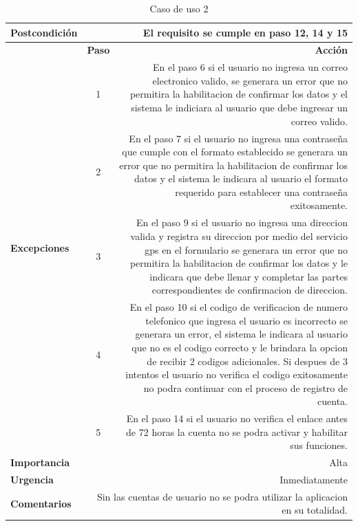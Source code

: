 \documentclass[conference]{IEEEtran}
\begin{document}
\begin{table}[H]
\begin{adjustbox}{width=0.45\textwidth}
\begin{tabular}{|p{11.215em}|r|r|}
    \midrule
    \textbf{Postcondición} & \multicolumn{2}{p{37.43em}|}{El requisito se cumple en paso 12, 14 y 15 } \\
    \midrule
    \multirow{6}[12]{*}{\textbf{Excepciones}} & \textbf{Paso} & \multicolumn{1}{p{32em}|}{\textbf{Acción}} \\
\cmidrule{2-3}    \multicolumn{1}{|c|}{} & \multicolumn{1}{c|}{1} & \multicolumn{1}{p{32em}|}{En el paso 6 si el usuario no ingresa un correo electronico valido, se generara un error que no permitira la habilitacion de confirmar los datos y el sistema le indiciara al usuario que debe ingresar un correo valido.} \\
\cmidrule{2-3}    \multicolumn{1}{|c|}{} & \multicolumn{1}{c|}{2} & \multicolumn{1}{p{32em}|}{En el paso 7 si el usuario no ingresa una contraseña que cumple con el formato establecido se generara un error que no permitira la habilitacion de confirmar los datos y el sistema le indicara al usuario el formato requerido para establecer una contraseña exitosamente.} \\
\cmidrule{2-3}    \multicolumn{1}{|c|}{} & \multicolumn{1}{c|}{3} & \multicolumn{1}{p{32em}|}{En el paso 9 si el usuario no ingresa una direccion valida y registra su direccion por medio del servicio gps en el formulario se generara un error que no permitira la habilitacion de confirmar los datos y le indicara que debe llenar y completar las partes correspondientes de confirmacion de direccion.} \\
\cmidrule{2-3}    \multicolumn{1}{|c|}{} & \multicolumn{1}{c|}{4} & \multicolumn{1}{p{32em}|}{En el paso 10 si el codigo de verificacion de numero telefonico que ingresa el usuario es incorrecto se generara un error, el sistema le indicara al usuario que no es el codigo correcto y le brindara la opcion de recibir 2 codigos adicionales. Si despues de 3 intentos el usuario no verifica el codigo exitosamente no podra continuar con el proceso de registro de cuenta.} \\
\cmidrule{2-3}    \multicolumn{1}{|c|}{} & \multicolumn{1}{c|}{5} & \multicolumn{1}{p{32em}|}{En el paso 14 si el usuario no verifica el enlace antes de 72 horas la cuenta no se podra activar y habilitar sus funciones.} \\
    \midrule
    \textbf{Importancia} & \multicolumn{2}{p{37.43em}|}{Alta} \\
    \midrule
    \textbf{Urgencia} & \multicolumn{2}{p{37.43em}|}{Inmediatamente} \\
    \midrule
    \textbf{Comentarios} & \multicolumn{2}{p{37.43em}|}{Sin las cuentas de usuario no se podra utilizar la aplicacion en su totalidad.} \\
    \bottomrule
    \end{tabular}%
    \end{adjustbox}
    \vspace{0.2cm}
    \caption{Caso de uso 2}
  \label{tab:addlabel}%
\end{table}%
\end{document}
